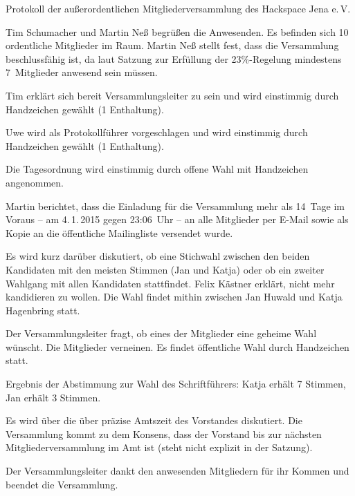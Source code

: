 \documentclass[ngerman]{scrartcl}
\begin{document}
\begin{Protokoll}{Protokoll der außerordentlichen Mitgliederversammlung des Hackspace Jena e.\,V.}

\protokollKopf{}


Tim Schumacher und Martin Neß begrüßen die Anwesenden.  Es befinden
sich 10 ordentliche Mitglieder im Raum.  Martin Neß stellt fest, dass
die Versammlung beschlussfähig ist, da laut Satzung zur Erfüllung der
23\%-Regelung mindestens 7~Mitglieder anwesend sein müssen.


Tim erklärt sich bereit Versammlungsleiter zu sein und wird einstimmig durch Handzeichen gewählt (1 Enthaltung).

Uwe wird als Protokollführer vorgeschlagen und wird einstimmig durch Handzeichen gewählt (1 Enthaltung).

Die Tagesordnung wird einstimmig durch offene Wahl mit Handzeichen angenommen.

Martin berichtet, dass die Einladung für die Versammlung mehr als 14~Tage im Voraus -- am 4.\,1.\,2015 
gegen 23:06~Uhr -- an alle Mitglieder per E-Mail sowie als Kopie an die öffentliche Mailingliste
versendet wurde.


Es wird kurz darüber diskutiert, ob eine Stichwahl zwischen den beiden Kandidaten mit den meisten Stimmen  
(Jan und Katja) oder ob ein zweiter Wahlgang mit allen Kandidaten stattfindet.
Felix Kästner erklärt, nicht mehr kandidieren zu wollen.
Die Wahl findet mithin zwischen Jan Huwald und Katja Hagenbring statt.

Der Versammlungsleiter fragt, ob eines der Mitglieder eine geheime Wahl wünscht.
Die Mitglieder verneinen. Es findet öffentliche Wahl durch Handzeichen statt.

Ergebnis der Abstimmung zur Wahl des Schriftführers:
Katja erhält 7 Stimmen, Jan erhält 3 Stimmen.



Es wird über die über präzise Amtszeit des Vorstandes diskutiert. Die Versammlung kommt zu dem Konsens, dass der Vorstand 
bis zur nächsten Mitgliederversammlung im Amt ist (steht nicht explizit in der Satzung).

Der Versammlungsleiter dankt den anwesenden Mitgliedern für ihr Kommen und beendet die Versammlung.

\end{Protokoll}
\end{document}
